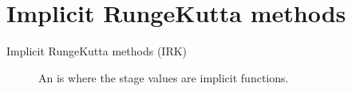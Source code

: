 \documentclass[letterpaper,10pt,english]{jupyterBook}
\begin{document}
\section{Implicit Runge\sphinxhyphen{}Kutta methods}
\label{\detokenize{8_Appendices/8.0_Cheat_sheet:implicit-runge-kutta-methods}}\begin{description}
\item[{Implicit Runge\sphinxhyphen{}Kutta methods (IRK)\label{\detokenize{8_Appendices/8.0_Cheat_sheet:term-Implicit-Runge-Kutta-methods-IRK}}}] \leavevmode
\sphinxAtStartPar
An {\hyperref[\detokenize{3_IRKs/3.0_IRKs:irk-chapter}]{}} is where the stage values are implicit functions.


\end{description}
\end{document}
